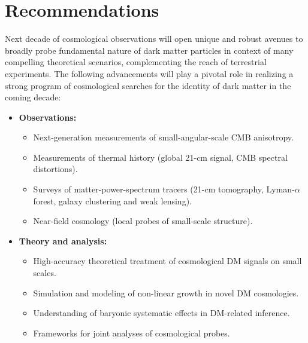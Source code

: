 \documentclass[12pt]{article}
\begin{document}
\section{Recommendations}
\label{sec:recommendations}
\vspace{-0.2cm}
Next decade of cosmological observations will open unique and robust avenues to broadly probe fundamental nature of dark matter particles in context of many compelling theoretical scenarios, complementing the reach of terrestrial experiments.
The following advancements will play a pivotal role in realizing a strong program of cosmological searches for the identity of dark matter in the coming decade:
\vspace{-0.cm}
\begin{itemize}
    \item \textbf{Observations:}
    \begin{itemize}
        \item Next-generation measurements of small-angular-scale CMB anisotropy.
        \item Measurements of thermal history (global 21-cm signal, CMB spectral distortions).
        \item Surveys of matter-power-spectrum tracers (21-cm tomography, Lyman-$\alpha$ forest, galaxy clustering and weak lensing).
        \item Near-field cosmology (local probes of small-scale structure).
    \end{itemize}
    \vspace{-0.2cm}
    \item \textbf{Theory and analysis:}
    \begin{itemize}
        \item High-accuracy theoretical treatment of cosmological DM signals on small scales.
        \item Simulation and modeling of non-linear growth in novel DM cosmologies.
        \item Understanding of baryonic systematic effects in DM-related inference.
        \item Frameworks for joint analyses of cosmological probes.
        \end{itemize}
\end{itemize}


\end{document}
